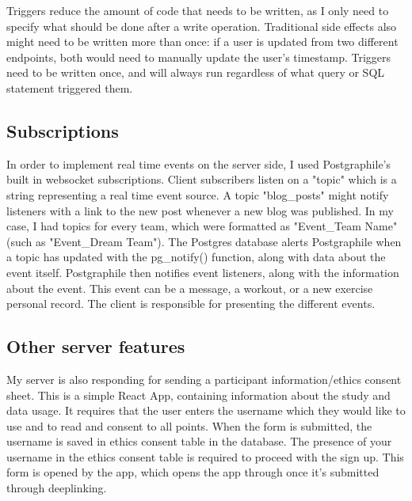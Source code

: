 \documentclass{l4proj}
\begin{document}
Triggers reduce the amount of code that needs to be written, as I only need to specify what should be done after a write operation. Traditional side effects also might need to be written more than once: if a user is updated from two different endpoints, both would need to manually update the user's timestamp. Triggers need to be written once, and will always run regardless of what query or SQL statement triggered them.

\subsection{Subscriptions}
In order to implement real time events on the server side, I used Postgraphile's built in websocket subscriptions. Client subscribers listen on a "topic" which is a string representing a real time event source. A topic "blog\_posts" might notify listeners with a link to the new post whenever a new blog was published. In my case, I had topics for every team, which were formatted as "Event\_{Team Name}" (such as "Event\_Dream Team"). The Postgres database alerts Postgraphile when a topic has updated with the pg\_notify() function, along with data about the event itself. Postgraphile then notifies event listeners, along with the information about the event. This event can be a message, a workout, or a new exercise personal record. The client is responsible for presenting the different events. 

\subsection{Other server features}
My server is also responding for sending a participant information/ethics consent sheet. This is a simple React App, containing information about the study and data usage. It requires that the user enters the username which they would like to use and to read and consent to all points. When the form is submitted, the username is saved in ethics consent table in the database. The presence of your username in the ethics consent table is required to proceed with the sign up. This form is opened by the app, which opens the app through once it's submitted through deeplinking. 
\end{document}
